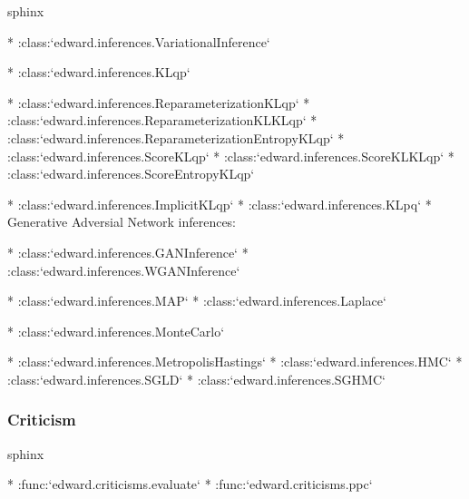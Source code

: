 {{sphinx

* :class:`edward.inferences.VariationalInference`

  * :class:`edward.inferences.KLqp`

    * :class:`edward.inferences.ReparameterizationKLqp`
    * :class:`edward.inferences.ReparameterizationKLKLqp`
    * :class:`edward.inferences.ReparameterizationEntropyKLqp`
    * :class:`edward.inferences.ScoreKLqp`
    * :class:`edward.inferences.ScoreKLKLqp`
    * :class:`edward.inferences.ScoreEntropyKLqp`

  * :class:`edward.inferences.ImplicitKLqp`
  * :class:`edward.inferences.KLpq`
  * Generative Adversial Network inferences:

    * :class:`edward.inferences.GANInference`
    * :class:`edward.inferences.WGANInference`

  * :class:`edward.inferences.MAP`
  * :class:`edward.inferences.Laplace`

* :class:`edward.inferences.MonteCarlo`

  * :class:`edward.inferences.MetropolisHastings`
  * :class:`edward.inferences.HMC`
  * :class:`edward.inferences.SGLD`
  * :class:`edward.inferences.SGHMC`

}}

\subsubsection{Criticism}

{{sphinx

* :func:`edward.criticisms.evaluate`
* :func:`edward.criticisms.ppc`

}}


